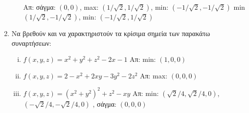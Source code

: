 \begin{enumerate}
\begin{enumerate}[i)]
        \hfill Απ: σάγμα: $(0,0) $, 
        max: $(1/ \sqrt{2} , 1/ \sqrt{2}) $, min: $ (-1/ \sqrt{2}, -1/ \sqrt{2}) $  
        min $(1/ \sqrt{2} , -1/ \sqrt{2}) $, min: $ (-1/ \sqrt{2}, 1/ \sqrt{2}) $  
    \end{enumerate}


  \item Να βρεθούν και να χαρακτηριστούν τα κρίσιμα σημεία  των παρακάτω συναρτήσεων:
    \begin{enumerate}[i)]
      \item $ f(x,y,z) = x^{2}+y^{2}+ z^{2} -2x-1 $
        \hfill Απ: min: $ (1,0,0) $  
      \item $ f(x,y,z) = 2-x^{2}+2xy-3y^{2}-2z^{2} $ 
        \hfill Απ: max: $ (0,0,0) $ 
      \item $ f(x,y,z) = (x^{2}+y^{2})^{2}+z^{2}-xy $
        \hfill Απ: min: $ (\sqrt{2} /4, \sqrt{2} /4,0) $, $ (- \sqrt{2} /4, -
        \sqrt{2} /4, 0) $ , σάγμα: $ (0,0,0) $
    \end{enumerate}

\end{enumerate}

